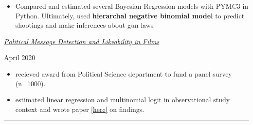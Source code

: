 \documentclass[
  16,
]{article}
\providecommand{\tightlist}{%
  \setlength{\itemsep}{0pt}\setlength{\parskip}{0pt}}\usepackage{longtable,booktabs,array}
\begin{document}
\begin{itemize}
\tightlist
\item
  Compared and estimated several Bayesian Regression models with PYMC3
  in Python. Ultimately, used \textbf{hierarchal negative binomial
  model} to predict shootings and make inferences about gun laws
\end{itemize}

\vspace{7pt}

\begin{large}
  \begin{multicols}{2}
    \begin{flushleft}\textit{\href{https://alexbass.me/projects/star_wars_capstone/}{Political Message Detection and Likeability in Films}}\end{flushleft}
    \begin{flushright}April 2020\end{flushright}
  \end{multicols}
  \vspace{-0.17cm}
\end{large}

\begin{itemize}
\tightlist
\item
  recieved award from Political Science department to fund a panel
  survey (n=1000).
\item
  estimated linear regression and multinomial logit in observational
  study context and wrote paper
  \href{https://alexbass.me/projects/star_wars_capstone/Capstone%20Project.pdf}{[here]} on findings.%
\end{itemize}

\begin{center}\rule{0.5\linewidth}{0.5pt}\end{center}
\end{document}

